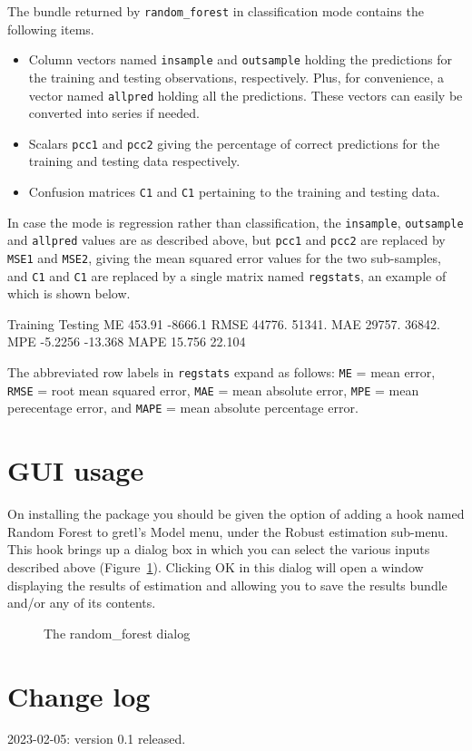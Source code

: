 \documentclass{article}
\begin{document}
The bundle returned by \texttt{random\_forest} in classification mode
contains the following items.
\begin{itemize}
\item Column vectors named \texttt{insample} and \texttt{outsample}
  holding the predictions for the training and testing observations,
  respectively. Plus, for convenience, a vector named \texttt{allpred}
  holding all the predictions. These vectors can easily be converted
  into series if needed.
\item Scalars \texttt{pcc1} and \texttt{pcc2} giving the percentage of
  correct predictions for the training and testing data respectively.
\item Confusion matrices \texttt{C1} and \texttt{C1} pertaining to the
  training and testing data.
\end{itemize}

In case the mode is regression rather than classification, the
\texttt{insample}, \texttt{outsample} and \texttt{allpred} values are
as described above, but \texttt{pcc1} and \texttt{pcc2} are replaced
by \texttt{MSE1} and \texttt{MSE2}, giving the mean squared error
values for the two sub-samples, and \texttt{C1} and \texttt{C1} are
replaced by a single matrix named \texttt{regstats}, an example of
which is shown below.
%
\begin{code}
         Training      Testing 
  ME       453.91      -8666.1 
RMSE       44776.       51341. 
 MAE       29757.       36842. 
 MPE      -5.2256      -13.368 
MAPE       15.756       22.104
\end{code}
%
The abbreviated row labels in \texttt{regstats} expand as follows:
\texttt{ME} = mean error, \texttt{RMSE} = root mean squared error,
\texttt{MAE} = mean absolute error, \texttt{MPE} = mean perecentage
error, and \texttt{MAPE} = mean absolute percentage error.


\section{GUI usage}

On installing the package you should be given the option of adding a
hook named \textsf{Random Forest} to gretl's \textsf{Model} menu, under
the \textsf{Robust estimation} sub-menu. This hook brings up a
dialog box in which you can select the various inputs described above
(Figure~\ref{fig:dialog}). Clicking \textsf{OK} in this dialog will
open a window displaying the results of estimation and allowing you to
save the results bundle and/or any of its contents.

\begin{figure}[htbp]
  \centering
  \caption{The random\_forest dialog}
  \label{fig:dialog}
\end{figure}

\section*{Change log}

2023-02-05: version 0.1 released.
\end{document}
